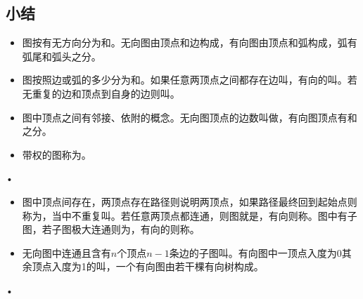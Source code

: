 \subsection{小结}
\begin{frame}\ft{\subsubsecname}
\begin{itemize}
\item 图按有无方向分为和。无向图由顶点和边构成，有向图由顶点和弧构成，弧有弧尾和弧头之分。\\[0.1in]
\item 图按照边或弧的多少分为和。如果任意两顶点之间都存在边叫，有向的叫。若无重复的边和顶点到自身的边则叫。\\[0.1in]
\item 图中顶点之间有邻接、依附的概念。无向图顶点的边数叫做，有向图顶点有和之分。\\[0.1in]
\item 带权的图称为。

\end{itemize}•
\end{frame}

\begin{frame}\ft{\subsubsecname}
\begin{itemize}
\item 图中顶点间存在，两顶点存在路径则说明两顶点，如果路径最终回到起始点则称为，当中不重复叫。若任意两顶点都连通，则图就是，有向则称。图中有子图，若子图极大连通则为，有向的则称。\\[0.1in]
\item 无向图中连通且含有$n$个顶点$n-1$条边的子图叫。有向图中一顶点入度为0其余顶点入度为1的叫，一个有向图由若干棵有向树构成。

\end{itemize}•
\end{frame}

